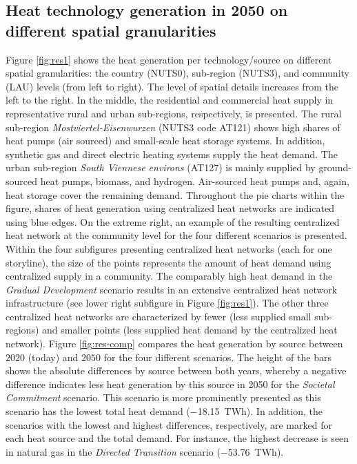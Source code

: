 \subsection{Heat technology generation in 2050 on different spatial granularities}\label{res:2}
Figure \ref{fig:res1} shows the heat generation per technology/source on different spatial granularities: the country (NUTS0), sub-region (NUTS3), and community (LAU) levels (from left to right). The level of spatial details increases from the left to the right. In the middle, the residential and commercial heat supply in representative rural and urban sub-regions, respectively, is presented. The rural sub-region \textit{Mostviertel-Eisenwurzen} (NUTS3 code AT121) shows high shares of heat pumps (air sourced) and small-scale heat storage systems. In addition, synthetic gas and direct electric heating systems supply the heat demand. The urban sub-region \textit{South Viennese environs} (AT127) is mainly supplied by ground-sourced heat pumps, biomass, and hydrogen. Air-sourced heat pumps and, again, heat storage cover the remaining demand. Throughout the pie charts within the figure, shares of heat generation using centralized heat networks are indicated using blue edges. On the extreme right, an example of the resulting centralized heat network at the community level for the four different scenarios is presented. Within the four subfigures presenting centralized heat networks (each for one storyline), the size of the points represents the amount of heat demand using centralized supply in a community. The comparably high heat demand in the \textit{Gradual Development} scenario results in an extensive centralized heat network infrastructure (see lower right subfigure in Figure \ref{fig:res1}). The other three centralized heat networks are characterized by fewer (less supplied small sub-regions) and smaller points (less supplied heat demand by the centralized heat network). Figure \ref{fig:res-comp} compares the heat generation by source between $2020$ (today) and $2050$ for the four different scenarios. The height of the bars shows the absolute differences by source between both years, whereby a negative difference indicates less heat generation by this source in 2050 for the \textit{Societal Commitment} scenario. This scenario is more prominently presented as this scenario has the lowest total heat demand (\SI{-18.15}{TWh}). In addition, the scenarios with the lowest and highest differences, respectively, are marked for each heat source and the total demand. For instance, the highest decrease is seen in natural gas in the \textit{Directed Transition} scenario (\SI{-53.76}{TWh}).

